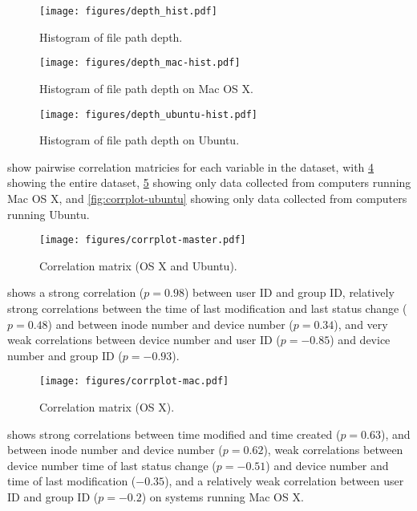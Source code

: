 \documentclass[12pt,letterpaper]{article}
\begin{document}
		\begin{figure}[H]
			\centerline{\texttt{[image: figures/depth\_hist.pdf]}}
			\caption{Histogram of file path depth.}
			\label{fig:depth}
		\end{figure}

		\begin{figure}[H]
			\centerline{\texttt{[image: figures/depth\_mac-hist.pdf]}}
			\caption{Histogram of file path depth on Mac OS X.}
			\label{fig:mac-depth}
		\end{figure}

				\begin{figure}[H]
			\centerline{\texttt{[image: figures/depth\_ubuntu-hist.pdf]}}
			\caption{Histogram of file path depth on Ubuntu.}
			\label{fig:ubuntu-depth}
		\end{figure}


		 show pairwise correlation matricies for each variable in the dataset, with \cref{fig:corrplot} showing the entire dataset, \cref{fig:corrplot-mac} showing only data collected from computers running Mac OS X, and \cref{fig:corrplot-ubuntu} showing only data collected from computers running Ubuntu.

		\begin{figure}[H]
			\centerline{\texttt{[image: figures/corrplot-master.pdf]}}
			\caption{Correlation matrix (OS X and Ubuntu).}
			\label{fig:corrplot}
		\end{figure}

		 shows a strong correlation ($p = 0.98$) between user ID and group ID, relatively strong correlations between the time of last modification and last status change ($p  = 0.48$) and between inode number and device number ($p = 0.34$), and very weak correlations between device number and user ID ($p = -0.85$) and device number and group ID ($ p = -0.93$).

		\begin{figure}[H]
			\centerline{\texttt{[image: figures/corrplot-mac.pdf]}}
			\caption{Correlation matrix (OS X).}
			\label{fig:corrplot-mac}
		\end{figure}

		 shows strong correlations between time modified and time created ($p = 0.63$), and between inode number and device number ($p = 0.62$),  weak correlations between device number time of last status change ($p = -0.51$) and device number and time of last modification ($-0.35$), and a relatively weak correlation between user ID and group ID ($p = -0.2$) on systems running Mac OS X.
\end{document}
